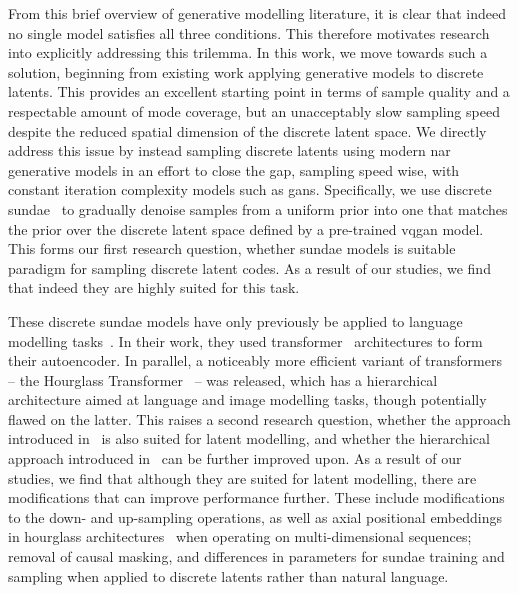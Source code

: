 From this brief overview of generative modelling literature, it is clear that
indeed no single model satisfies all three conditions. This therefore motivates
research into explicitly addressing this trilemma. In this work, we move towards
such a solution, beginning from existing work applying generative models to
discrete latents. This provides an excellent starting point in terms of sample
quality and a respectable amount of mode coverage, but an unacceptably slow
sampling speed despite the reduced spatial dimension of the discrete latent
space. We directly address this issue by instead sampling discrete latents using
modern \gls{nar} generative models in an effort to close the gap, sampling speed
wise, with constant iteration complexity models such as \glspl{gan}.
Specifically, we use discrete \gls{sundae}~\cite{savinov2022stepunrolled} to
gradually denoise samples from a uniform prior into one that matches the prior
over the discrete latent space defined by a pre-trained \gls{vqgan} model. This
forms our first research question, whether \gls{sundae} models is suitable
paradigm for sampling discrete latent codes. As a result of our studies, we find
that indeed they are highly suited for this task.

These discrete \gls{sundae} models have only previously be applied to language
modelling tasks~\cite{savinov2022stepunrolled}. In their work, they used
transformer~\cite{vaswani2017attention} architectures to form their autoencoder.
In parallel, a noticeably more efficient variant of transformers -- the
Hourglass Transformer~\cite{nawrot2021hierarchical} -- was released, which has a
hierarchical architecture aimed at language and image modelling tasks, though
potentially flawed on the latter. This raises a second research question,
whether the approach introduced in~\citet{savinov2022stepunrolled} is also
suited for latent modelling, and whether the hierarchical approach introduced
in~\citet{nawrot2021hierarchical} can be further improved upon. As a result of
our studies, we find that although they are suited for latent modelling, there
are modifications that can improve performance further. These include
modifications to the down- and up-sampling operations, as well as axial
positional embeddings in hourglass architectures~\cite{nawrot2021hierarchical}
when operating on multi-dimensional sequences; removal of causal masking, and
differences in parameters for \gls{sundae} training and sampling when applied to
discrete latents rather than natural language.

